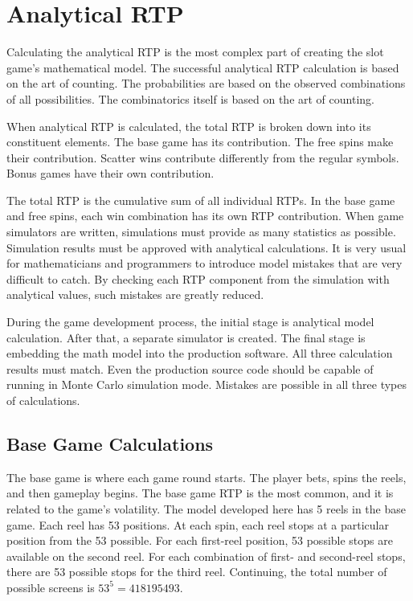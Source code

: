 \documentclass[12pt,twoside,openany]{book}
\begin{document}
\chapter{Analytical RTP}

Calculating the analytical RTP is the most complex part of creating the slot game's mathematical model. The successful analytical RTP calculation is based on the art of counting. The probabilities are based on the observed combinations of all possibilities. The combinatorics itself is based on the art of counting. 

When analytical RTP is calculated, the total RTP is broken down into its constituent elements. The base game has its contribution. The free spins make their contribution. Scatter wins contribute differently from the regular symbols. Bonus games have their own contribution. 

The total RTP is the cumulative sum of all individual RTPs. In the base game and free spins, each win combination has its own RTP contribution. When game simulators are written, simulations must provide as many statistics as possible. Simulation results must be approved with analytical calculations. It is very usual for mathematicians and programmers to introduce model mistakes that are very difficult to catch. By checking each RTP component from the simulation with analytical values, such mistakes are greatly reduced.

During the game development process, the initial stage is analytical model calculation. After that, a separate simulator is created. The final stage is embedding the math model into the production software. All three calculation results must match. Even the production source code should be capable of running in Monte Carlo simulation mode. Mistakes are possible in all three types of calculations.

\section*{Base Game Calculations}

The base game is where each game round starts. The player bets, spins the reels, and then gameplay begins. The base game RTP is the most common, and it is related to the game's volatility. The model developed here has 5 reels in the base game. Each reel has 53 positions. At each spin, each reel stops at a particular position from the 53 possible. For each first-reel position, 53 possible stops are available on the second reel. For each combination of first- and second-reel stops, there are 53 possible stops for the third reel. Continuing, the total number of possible screens is $53^5 = 418195493$.
\end{document}
